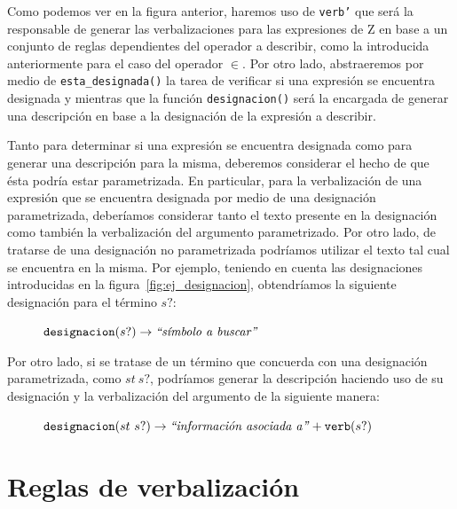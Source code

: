 Como podemos ver en la figura anterior, haremos uso de \texttt{verb'} que será la responsable de generar las verbalizaciones para las expresiones de Z en base a un conjunto de reglas dependientes del operador a describir, como la introducida anteriormente para el caso del operador $\in$. Por otro lado, abstraeremos por medio de \texttt{esta\_designada()} la tarea de verificar si una expresión se encuentra designada y mientras que la función \texttt{designacion()} será la encargada de generar una descripción en base a la designación de la expresión a describir. 


Tanto para determinar si una expresión se encuentra designada como para generar una descripción para la misma, deberemos considerar el hecho de que ésta podría estar parametrizada. En particular, para la verbalización de una expresión que se encuentra designada por medio de una designación parametrizada, deberíamos considerar tanto el texto presente en la designación como también la verbalización del argumento parametrizado. Por otro lado, de tratarse de una designación no parametrizada podríamos utilizar el texto tal cual se encuentra en la misma. Por ejemplo, teniendo en cuenta las designaciones introducidas en la figura~\ref{fig:ej_designacion}, obtendríamos la siguiente designación para el término $s?$:

\begin{figure}[H]
\center
$\texttt{designacion}(s?) \rightarrow \text{\emph{``símbolo a buscar''}}$
\end{figure}

\noindent
Por otro lado, si se tratase de un término que concuerda con una designación parametrizada, como $st~s?$, podríamos generar la descripción haciendo uso de su designación y la verbalización del argumento de la siguiente manera: 

\begin{figure}[H]
\center
$\texttt{designacion}(st~s?) \rightarrow \text{\emph{``información asociada a''}} + \texttt{verb}(s?)$
\end{figure}


\section{Reglas de verbalización}
\label{sec:corpus_reglas}

